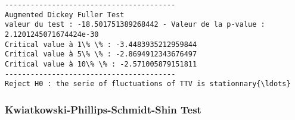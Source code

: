 \documentclass[11pt]{article}
\begin{document}
    \begin{Verbatim}[commandchars=\\\{\}]
----------------------------------------
Augmented Dickey Fuller Test
valeur du test : -18.501751389268442 - Valeur de la p-value : 2.1201245071674424e-30
Critical value à 1\% \% : -3.4483935212959844
Critical value à 5\% \% : -2.8694912343676497
Critical value à 10\% \% : -2.571005879151811
----------------------------------------
Reject H0 : the serie of fluctuations of TTV is stationnary{\ldots}

    \end{Verbatim}

    \subsubsection{Kwiatkowski-Phillips-Schmidt-Shin
Test}\label{kwiatkowski-phillips-schmidt-shin-test}
\end{document}
